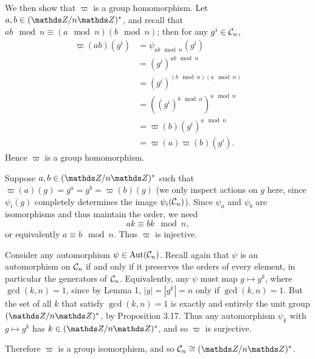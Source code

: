 \documentclass{homework}
\begin{document}
\begin{solution}
  We then show that $\varpi$ is a group homomorphism. Let $a,b\in (\Z / n\Z)^*$, and recall that
  $ab\mod{n}\equiv (a\mod{n})(b\mod{n})$; then for any $g^i\in \mathcal{C}_n$,
  \begin{align*}
    \varpi(ab)(g^i)&=\psi_{ab\mod{n}}(g^i)\\
    &=(g^i)^{ab\mod{n}}\\
    &=(g^i)^{(b\mod{n})(a\mod{n})}\\
    &=\left( (g^i)^{b\mod{n}} \right) ^{a\mod{n}}\\
    &=\varpi(b)(g^i)^{a\mod{n}}\\
    &=\varpi(a)\varpi(b)(g^i)
  .\end{align*}
  Hence $\varpi$ is a group homomorphism.


  Suppose $a,b\in (\Z / n\Z)^*$ such that $\varpi(a)(g)=g^{a}=g^{b}=\varpi(b)(g)$ (we only inspect
  actions on $g$ here, since $\psi_i(g)$ completely determines the image $\psi_i(\mathcal{C}_n)$). Since
  $\psi_a$ and $\psi_b$ are isomorphisms and thus maintain the order, we need \[
    ak\equiv bk\mod{n}
  ,\] or equivalently $a\equiv b\mod{n}$. Thus $\varpi$ is injective.

  Consider any automorphism $\psi\in \operatorname{Aut}(\mathcal{C}_n)$. Recall again that $\psi$ is an automorphism on
  $\mathcal{C}_n$ if and only if it preserves the orders of every element, in particular the generators
  of $\mathcal{C}_n$. Equivalently, any $\psi$ must map $g\mapsto g^k$, where $\gcd{(k,n)}=1$, since by
  Lemma 1, $\left| g \right| =\left| g^k \right| =n$ only if $\gcd{(k,n)}=1$. But the set of all $k$
  that satisfy $\gcd{(k,n)}=1$ is exactly and entirely the unit group $(\Z / n\Z)^*$, by Proposition
  3.17. Thus any automorphism $\psi_k$ with $g\mapsto g^k$ has $k\in (\Z / n\Z)^*$, and so $\varpi$
  is surjective.

  Therefore $\varpi$ is a group isomorphism, and so $\mc{C}_n\cong (\Z / n\Z)^*$.
\end{solution}
\end{document}
